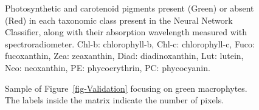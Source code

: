 \documentclass[
  number]{elsarticle}
\begin{document}
\label{cell-fig-Pigm}
\begin{figure}[H]


\caption{\label{fig-Pigm}Photosynthetic and carotenoid pigments present
(Green) or absent (Red) in each taxonomic class present in the Neural
Network Classifier, along with their absorption wavelength measured with
spectroradiometer. Chl-b: chlorophyll-b, Chl-c: chlorophyll-c, Fuco:
fucoxanthin, Zea: zeaxanthin, Diad: diadinoxanthin, Lut: lutein, Neo:
neoxanthin, PE: phycoerythrin, PC: phycocyanin.}

\end{figure}%

\label{cell-fig-ValidationGreen}
\begin{figure}[H]


\caption{\label{fig-ValidationGreen}Sample of
Figure~\ref{fig-Validation} focusing on green macrophytes. The labels
inside the matrix indicate the number of pixels.}

\end{figure}%
\end{document}
